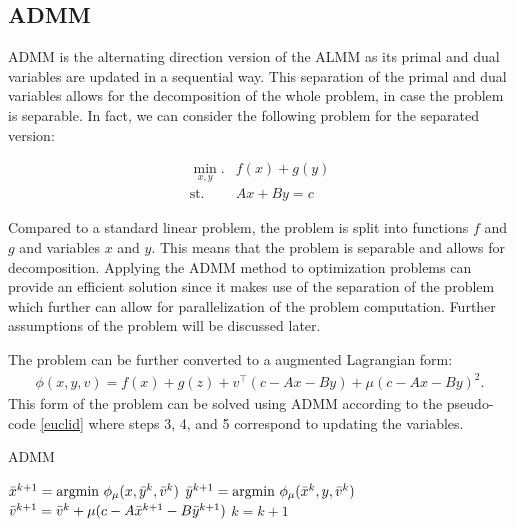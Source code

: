 \documentclass[a4paper]{artikel3}
\begin{document}
\subsection{ADMM} \label{sec:ADMM}

ADMM is the alternating direction version of the ALMM as its primal and dual variables are updated in a sequential way. This separation of the primal and dual variables allows for the decomposition of the whole problem, in case the problem is separable. In fact, we can consider the following problem for the separated version:

\begin{align}
    \min_{x,y}.  & f(x)+g(y) \\
    \text{st.} &Ax +By = c
\end{align}

Compared to a standard linear problem, the problem is split into functions $f$ and $g$ and variables $x$ and $y$. This means that the problem is separable and allows for decomposition. Applying the ADMM method to optimization problems can provide an efficient solution since it makes use of the separation of the problem which further can allow for parallelization of the problem computation. Further assumptions of the problem will be discussed later. 

The problem can be further converted to a augmented Lagrangian form:
\begin{align*}
    \phi (x,y,v) = f(x)+g(z)+v^{\top} (c-Ax-By)+\mu (c -Ax - By)^2.
\end{align*}
This form of the problem can be solved using ADMM according to the pseudo-code \ref{euclid} where steps 3, 4, and 5 correspond to updating the variables. %

\begin{algorithm}[H]
    \caption{ADMM}\label{euclid}
    \begin{algorithmic}[1]
        \State $\Bar{x}^{k+1} = \text{argmin } \phi_{\mu} (x, \Bar{y}^k, \Bar{v}^k)$
        \State $\Bar{y}^{k+1} = \text{argmin } \phi_{\mu} (\Bar{x}^k, y, \Bar{v}^k)$
        \State $\Bar{v}^{k+1} = \Bar{v}^k + \mu (c-A \Bar{x}^{k+1} - B \Bar{y}^{k+1})$
        \State $k = k +1$
        \EndWhile
    \end{algorithmic}
\end{algorithm}
\end{document}
